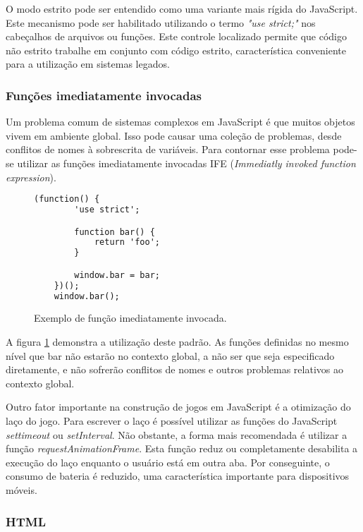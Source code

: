 O modo estrito pode ser entendido como uma variante mais rígida do
JavaScript. Este mecanismo pode ser habilitado utilizando o termo
\textit{"use strict;"} nos cabeçalhos de arquivos ou funções.
Este controle localizado permite que código não estrito trabalhe
em conjunto com código estrito, característica conveniente para a
utilização em sistemas legados.

\subsubsection{Funções imediatamente invocadas}

Um problema comum de sistemas complexos em JavaScript é que muitos
objetos vivem em ambiente global. Isso pode causar uma coleção de
problemas, desde conflitos de nomes à sobrescrita de variáveis. Para
contornar esse problema pode-se utilizar as funções imediatamente
invocadas IFE (\textit{Immediatly invoked function expression}).

\begin{figure}[H]
\centering
\begin{lstlisting}[language=html,frame=single]
    (function() {
        'use strict';

        function bar() {
            return 'foo';
        }

        window.bar = bar;
    })();
    window.bar();
\end{lstlisting}
\caption{Exemplo de função imediatamente invocada.}
\label{fig:iife}
\end{figure}

A figura \ref{fig:iife} demonstra a utilização deste padrão. As
funções definidas no mesmo nível que bar não estarão no contexto
global, a não ser que seja especificado diretamente, e não sofrerão
conflitos de nomes e outros problemas relativos ao contexto global.

Outro fator importante na construção de jogos em JavaScript é a
otimização do laço do jogo. Para escrever o laço é possível
utilizar as funções do JavaScript \textit{settimeout} ou
\textit{setInterval}. Não obstante, a forma mais recomendada é
utilizar a função \textit{requestAnimationFrame}. Esta função reduz
ou completamente desabilita a execução do laço enquanto o usuário está
em outra aba. Por conseguinte, o consumo de bateria é reduzido, uma
característica importante para dispositivos móveis.

\subsubsection{HTML}

